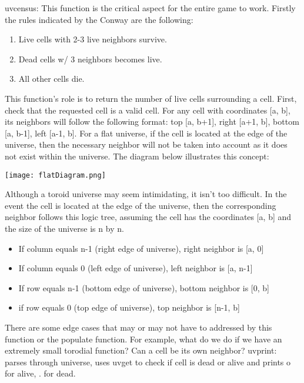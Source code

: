 \documentclass{article}
\begin{document}
uv\textunderscore census: This function is the critical aspect for the entire game to work. Firstly the rules indicated by the Conway are the following:
\begin{enumerate}
    \item Live cells with 2-3 live neighbors survive.
    \item Dead cells w/ 3 neighbors becomes live.
    \item All other cells die.
\end{enumerate}
This function's role is to return the number of live cells surrounding a cell. First, check that the requested cell is a valid cell. For any cell with coordinates [a, b], its neighbors will follow the following format: top [a, b+1], right [a+1, b], bottom [a, b-1], left [a-1, b]. 
For a flat universe, if the cell is located at the edge of the universe, then the necessary neighbor will not be taken into account as it does not exist within the universe. The diagram below illustrates this concept:
\begin{center}
\texttt{[image: flatDiagram.png]}
\end{center}
Although a toroid universe may seem intimidating, it isn't too difficult. In the event the cell is located at the edge of the universe, then the corresponding neighbor follows this logic tree, assuming the cell has the coordinates [a, b] and the size of the universe is n by n.
\begin{itemize}
    \item If column equals n-1 (right edge of universe), right neighbor is [a, 0]
    \item If column equals 0 (left edge of universe), left neighbor is [a, n-1]
    \item If row equals n-1 (bottom edge of universe), bottom neighbor is [0, b]
    \item if row equals 0 (top edge of universe), top neighbor is [n-1, b]
\end{itemize}
There are some edge cases that may or may not have to addressed by this function or the populate function. For example, what do we do if we have an extremely small torodial function? Can a cell be its own neighbor?
uv\textunderscore print: parses through universe, uses uv\textunderscore get to check if cell is dead or alive and prints o for alive, . for dead. 
\end{document}
